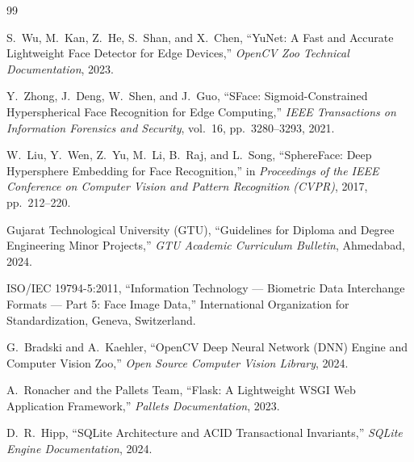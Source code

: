 \documentclass[12pt,a4paper,oneside]{report}
\begin{document}
\clearpage

\tableofcontents
\clearpage
{}
\listoffigures
\clearpage
{}
\listoftables
\clearpage









\clearpage
\begin{thebibliography}{99}

S.~Wu, M.~Kan, Z.~He, S.~Shan, and X.~Chen,
``YuNet: A Fast and Accurate Lightweight Face Detector for Edge Devices,''
\emph{OpenCV Zoo Technical Documentation}, 2023.

Y.~Zhong, J.~Deng, W.~Shen, and J.~Guo,
``SFace: Sigmoid-Constrained Hyperspherical Face Recognition for Edge Computing,''
\emph{IEEE Transactions on Information Forensics and Security}, vol.~16, pp.~3280--3293, 2021.

W.~Liu, Y.~Wen, Z.~Yu, M.~Li, B.~Raj, and L.~Song,
``SphereFace: Deep Hypersphere Embedding for Face Recognition,''
in \emph{Proceedings of the IEEE Conference on Computer Vision and Pattern Recognition (CVPR)}, 2017, pp.~212--220.

Gujarat Technological University (GTU),
``Guidelines for Diploma and Degree Engineering Minor Projects,''
\emph{GTU Academic Curriculum Bulletin}, Ahmedabad, 2024.

ISO/IEC 19794-5:2011,
``Information Technology --- Biometric Data Interchange Formats --- Part 5: Face Image Data,''
International Organization for Standardization, Geneva, Switzerland.

G.~Bradski and A.~Kaehler,
``OpenCV Deep Neural Network (DNN) Engine and Computer Vision Zoo,''
\emph{Open Source Computer Vision Library}, 2024.

A.~Ronacher and the Pallets Team,
``Flask: A Lightweight WSGI Web Application Framework,''
\emph{Pallets Documentation}, 2023.

D.~R.~Hipp,
``SQLite Architecture and ACID Transactional Invariants,''
\emph{SQLite Engine Documentation}, 2024.

\end{thebibliography}
\end{document}
